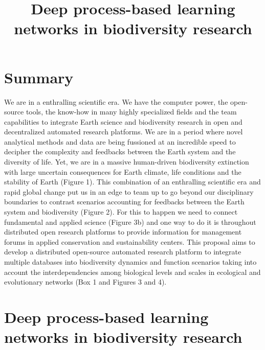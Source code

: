 \documentclass[twocolumn]{article}
\title{{Deep process-based learning networks in biodiversity research}}
\author[]{}
\date{} %
\begin{document}
\maketitle


\section*{Summary}
We are in a enthralling scientific era. We have the computer power,
the open-source tools, the know-how in many highly specialized fields
and the team capabilities to integrate Earth science and biodiversity
research in open and decentralized automated research platforms. We
are in a period where novel analytical methods and data are being
fussioned at an incredible speed to decipher the complexity and
feedbacks between the Earth system and the diversity of life. Yet, we
are in a massive human-driven biodiversity extinction with large
uncertain consequences for Earth climate, life conditions and the
stability of Earth (Figure 1). This combination of an enthralling
scientific era and rapid global change put us in an edge to team up to
go beyond our disciplinary boundaries to contrast scenarios accounting
for feedbacks between the Earth system and biodiversity (Figure
2). For this to happen we need to connect fundamental and applied
science (Figure 3b) and one way to do it is throughout distributed
open research platforms to provide information for management forums in
applied conservation and sustainability centers. This proposal aims to
develop a distributed open-source automated research platform to
integrate multiple databases into biodiversity dynamics and function
scenarios taking into account the interdependencies among biological
levels and scales in ecological and evolutionary networks (Box 1 and
Figures 3 and 4).

\newpage
\setcounter{page}{0}
\clearpage
\pagebreak
\section*{Deep process-based learning networks in biodiversity research}
\end{document}
